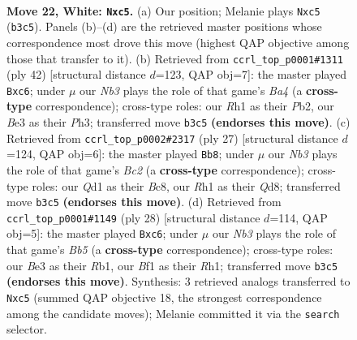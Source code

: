 \documentclass[11pt]{article}
\begin{document}
\begin{figure}[p]\centering
\begin{subfigure}{0.46\textwidth}\centering
\resizebox{\linewidth}{!}{%
\newchessgame
\chessboard[
  setfen={r1b2kr1/1p2bp1p/p3n1p1/2npq3/8/1N1KBPN1/PP4PP/1R1Q1B1R w - - 0 22},
  showmover=false,
  pgfstyle=straightmove, color=movearrow, markmove={b3-c5}
]}
\caption{}
\end{subfigure}\hfill
\begin{subfigure}{0.46\textwidth}\centering
\resizebox{\linewidth}{!}{%
\newchessgame
\chessboard[
  setfen={2b3k1/1pr2ppp/p1nq1n2/2Np4/B2P4/P4N1P/1P3PP1/2RQ2K1 w - - 4 22},
  showmover=false,
  pgfstyle=straightmove, color=movearrow, markmove={a4-c6}
]}
\caption{}
\end{subfigure}
\\[4pt]
\begin{subfigure}{0.46\textwidth}\centering
\resizebox{\linewidth}{!}{%
\newchessgame
\chessboard[
  setfen={r1bq1rk1/p1bn2p1/4p2p/1N1p1p2/3Pn3/5NP1/P1Q1PPBP/1RB2RK1 b - - 1 14},
  showmover=false,
  pgfstyle=straightmove, color=movearrow, markmove={c7-b8}
]}
\caption{}
\end{subfigure}\hfill
\begin{subfigure}{0.46\textwidth}\centering
\resizebox{\linewidth}{!}{%
\newchessgame
\chessboard[
  setfen={r1b2kr1/pp2p1b1/2n2n1p/1BqpNpp1/8/2P1P1B1/P2N1PPP/1R1QK2R w K - 4 15},
  showmover=false,
  pgfstyle=straightmove, color=movearrow, markmove={b5-c6}
]}
\caption{}
\end{subfigure}
\caption{\textbf{Move 22, White: \texttt{Nxc5}.} (a) Our position; Melanie plays \texttt{Nxc5} (\texttt{b3c5}). Panels (b)--(d) are the retrieved master positions whose correspondence most drove this move (highest QAP objective among those that transfer to it). (b) Retrieved from \texttt{ccrl\_top\_p0001\#1311} (ply 42) [structural distance $d$=123, QAP obj=7]: the master played \texttt{Bxc6}; under $\mu$ our \emph{Nb3} plays the role of that game's \emph{Ba4} (a \textbf{cross-type} correspondence); cross-type roles: our \emph{R}h1 as their \emph{P}b2, our \emph{B}e3 as their \emph{P}h3; transferred move \texttt{b3c5} \textbf{(endorses this move)}. (c) Retrieved from \texttt{ccrl\_top\_p0002\#2317} (ply 27) [structural distance $d$=124, QAP obj=6]: the master played \texttt{Bb8}; under $\mu$ our \emph{Nb3} plays the role of that game's \emph{Bc2} (a \textbf{cross-type} correspondence); cross-type roles: our \emph{Q}d1 as their \emph{B}c8, our \emph{R}h1 as their \emph{Q}d8; transferred move \texttt{b3c5} \textbf{(endorses this move)}. (d) Retrieved from \texttt{ccrl\_top\_p0001\#1149} (ply 28) [structural distance $d$=114, QAP obj=5]: the master played \texttt{Bxc6}; under $\mu$ our \emph{Nb3} plays the role of that game's \emph{Bb5} (a \textbf{cross-type} correspondence); cross-type roles: our \emph{B}e3 as their \emph{R}b1, our \emph{B}f1 as their \emph{R}h1; transferred move \texttt{b3c5} \textbf{(endorses this move)}. Synthesis: 3 retrieved analogs transferred to \texttt{Nxc5} (summed QAP objective 18, the strongest correspondence among the candidate moves); Melanie committed it via the \texttt{search} selector.}
\label{fig:thought-m42}
\end{figure}
\end{document}
